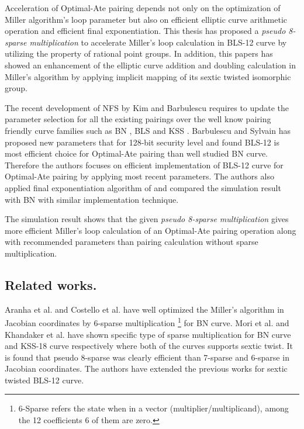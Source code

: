 Acceleration of Optimal-Ate pairing depends not only on the optimization of Miller algorithm's loop parameter but also on efficient elliptic curve arithmetic operation and efficient final exponentiation.  
This thesis has proposed a \textit{pseudo 8-sparse multiplication} to accelerate Miller's loop calculation in BLS-12 curve by utilizing the property of  rational point groups.
In addition, this papers has showed an enhancement of the elliptic curve addition and doubling calculation in Miller's algorithm by applying implicit mapping of its sextic twisted isomorphic group. 

The recent development of NFS by Kim and Barbulescu \cite{C:KimBar16} requires to update the parameter selection for all the existing pairings over the well know pairing friendly curve families such as BN \cite{SAC:BarNae05}, BLS \cite{SCN:BarLynSco02} and KSS \cite{EPRINT:KacSchSco07}.
Barbulescu and Sylvain \cite{sylvain_new_param} has proposed new parameters that for 128-bit security level and found BLS-12 is most efficient choice for Optimal-Ate pairing than well studied BN curve. Therefore the authors focuses on efficient implementation of BLS-12 curve for Optimal-Ate pairing by applying most recent parameters. 
The authors also applied final exponentiation algorithm of \cite{EPRINT:GhaFou16a} and compared the simulation result with BN with similar implementation technique.

The simulation result shows that the given \textit{pseudo 8-sparse multiplication} gives more efficient Miller's loop calculation of an Optimal-Ate pairing operation along with recommended parameters than pairing calculation without sparse multiplication.

\subsection*{Related works.}
Aranha et al. \cite[Section 4]{EC:AKLGL11} and Costello et al. \cite{PKC:CosLanNae10} have  well optimized the Miller's algorithm in Jacobian coordinates by 6-sparse multiplication \footnote{\label{6sparse}{6-Sparse refers the state when in a vector (multiplier/multiplicand), among the 12 coefficients 6 of them are zero.}} for BN curve. 
Mori et al. \cite{PAIRING:MANS13} and Khandaker et al. \cite{ICISC:KONSD16} have shown  specific type of sparse multiplication for BN curve and KSS-18 curve respectively where both of the curves supports sextic twist.
It is found that pseudo 8-sparse was clearly efficient than 7-sparse and 6-sparse in Jacobian coordinates.
The authors have extended the previous works for sextic twisted BLS-12 curve.


